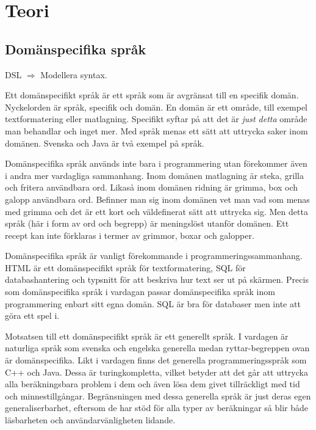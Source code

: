 
\chapter{Teori}

\section{Domänspecifika språk}
\begin{binge}
DSL $\Rightarrow$ Modellera syntax.
\end{binge}
\begin{draft}

Ett domänspecifikt språk är ett språk som är avgränsat till en specifik domän. Nyckelorden är språk, specifik och domän. En domän är ett område, till exempel textformatering eller matlagning. Specifikt syftar på att det är \textit{just detta} område man behandlar och inget mer. Med språk menas ett sätt att uttrycka saker inom domänen. Svenska och Java är två exempel på språk.

Domänspecifika språk används inte bara i programmering utan förekommer även i andra mer vardagliga sammanhang. Inom domänen matlagning är steka, grilla och fritera användbara ord. Likaså inom domänen ridning är grimma, box och galopp användbara ord. Befinner man sig inom domänen vet man vad som menas med grimma och det är ett kort och väldefinerat sätt att uttrycka sig. Men detta språk (här i form av ord och begrepp) är meningslöst utanför domänen. Ett recept kan inte förklaras i termer av grimmor, boxar och galopper.

Domänspecifika språk är vanligt förekommande i programmeringssammanhang. HTML är ett domänspecifikt språk för textformatering, SQL för databashantering och typsnitt för att beskriva hur text ser ut på skärmen. Precis som domänspecifika språk i vardagan passar domänspecifika språk inom programmering enbart sitt egna domän. SQL är bra för databaser men inte att göra ett spel i.

Motsatsen till ett domänspecifikt språk är ett generellt språk. I vardagen är naturliga språk som svenska och engelska generella medan ryttar-begreppen ovan är domänspecifika. Likt i vardagen finns det generella programmeringsspråk som C++ och Java. Dessa är turingkompletta, vilket betyder att det går att uttrycka alla beräkningsbara problem i dem och även lösa dem givet tillräckligt med tid och minnestillgångar.\cite{turing_ne} \cite{turing_book} Begränsningen med dessa generella språk är just deras egen generaliserbarhet, eftersom de har stöd för alla typer av beräkningar så blir både läsbarheten och användarvänligheten lidande.


\end{draft}
